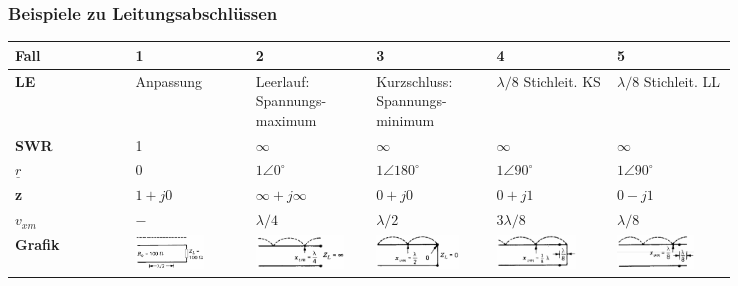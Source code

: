 \subsubsection{Beispiele zu Leitungsabschlüssen}
		\renewcommand{\arraystretch}{1.1}
		\begin{tabular}{| p{0.14\linewidth} | p{0.14\linewidth}  | p{0.14\linewidth}  | p{0.14\linewidth}  | p{0.14\linewidth}  | p{0.14\linewidth}  |}
			\hline
				\textbf{Fall}
				& 1
				& 2 
				& 3
				& 4
				& 5 \\
			\hline
				\textbf{LE}
				& Anpassung
				& Leerlauf: \newline Spannungs-\newline maximum
				& Kurzschluss: \newline Spannungs-\newline minimum
				& $\lambda/8$ Stichleit. KS
				& $\lambda/8$ Stichleit. LL \\
			\hline
				\textbf{SWR}
				& 1
				& $\infty$
				& $\infty$
				& $\infty$
				& $\infty$ \\
			\hline
				\textbf{$\underline{r}$}
				& $0$
				& $1 \angle 0 ^\circ$
				& $1 \angle 180 ^\circ$
				& $1 \angle 90 ^\circ$
				& $1 \angle 90 ^\circ$\\
			\hline
				\textbf{z}
				& $1+j0$
				& $\infty+j\infty$
				& $0+j0$
				& $0+j1$
				& $0-j1$ \\
			\hline
				\textbf{$v_{xm}$}
				& $-$
				& $\lambda/4$
				& $\lambda/2$
				& $3\lambda/8$
				& $\lambda/8$ \\
			\hline
				\textbf{Grafik}
				& \includegraphics[height=0.9cm]{./bilder/Fall1.png}
				& \includegraphics[height=0.9cm]{./bilder/Fall2.png}
				& \includegraphics[height=0.9cm]{./bilder/Fall3.png}
				& \includegraphics[height=0.9cm]{./bilder/Fall4.png}
				& \includegraphics[height=0.9cm]{./bilder/Fall5.png} \\
			\hline
		\end{tabular}

